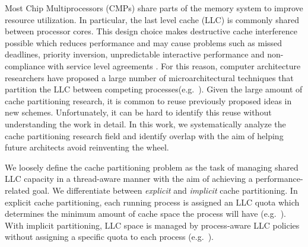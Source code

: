 Most Chip Multiprocessors (CMPs) share parts of the memory system to improve resource utilization.
In particular, the last level cache (LLC) is commonly shared between processor cores.
This design choice makes destructive cache interference possible which reduces performance and may cause problems such as missed deadlines, priority inversion, unpredictable interactive performance and non-compliance with service level agreements \cite{dubois13}.
For this reason, computer architecture researchers have proposed a large number of microarchitectural techniques that partition the LLC between competing processes(e.g.\ \cite{suh02,dynPartofSharedCacheMemory,utilityBasedCachePartitioning,haakonHiPC,jaleel08,xie09,jaleel10,xie10,manikantan11,sanchez11,sundararajan12,manikantan12,duong12,hasenplaugh12,albericio13}).
Given the large amount of cache partitioning research, it is common to reuse previously proposed ideas in new schemes.
Unfortunately, it can be hard to identify this reuse without understanding the work in detail.
In this work, we systematically analyze the cache partitioning research field and identify overlap with the aim of helping future architects avoid reinventing the wheel.

We loosely define the cache partitioning problem as the task of managing shared LLC capacity in a thread-aware manner with the aim of achieving a performance-related goal.
We differentiate between \textit{explicit} and \textit{implicit} cache partitioning.
In explicit cache partitioning, each running process is assigned an LLC quota which determines the minimum amount of cache space the process will have (e.g.\ \cite{suh02,dynPartofSharedCacheMemory,utilityBasedCachePartitioning,haakonHiPC,xie09}).
With implicit partitioning, LLC space is managed by process-aware LLC policies without assigning a specific quota to each process (e.g.\ \cite{jaleel08,jaleel10,manikantan11,albericio13}).

